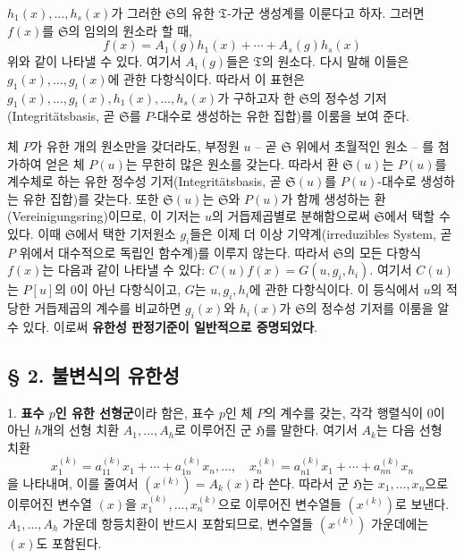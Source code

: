 $h_1(x),\ldots,h_s(x)$가 그러한 $\mathfrak S$의 유한 $\mathfrak T$-가군 생성계를 이룬다고 하자. 그러면 $f(x)$를 $\mathfrak S$의 임의의 원소라 할 때,
\[
 f(x)=A_1(g)h_1(x)+\cdots+A_s(g)h_s(x)
\]
위와 같이 나타낼 수 있다. 여기서 $A_i(g)$들은 $\mathfrak T$의 원소다. 다시 말해 이들은 $g_1(x),\ldots,g_t(x)$에 관한 다항식이다. 따라서 이 표현은 $g_1(x),\ldots,g_t(x),h_1(x),\ldots,h_s(x)$가 구하고자 한 $\mathfrak S$의 정수성 기저(Integrit\"atsbasis, 곧 $\mathfrak S$를 $P$-대수로 생성하는 유한 집합)를 이룸을 보여 준다.

체 $P$가 유한 개의 원소만을 갖더라도, 부정원 $u$ -- 곧 $\mathfrak S$ 위에서 초월적인 원소 -- 를 첨가하여 얻은 체 $P(u)$는 무한히 많은 원소를 갖는다. 따라서 환 $\mathfrak S(u)$는 $P(u)$를 계수체로 하는 유한 정수성 기저(Integritätsbasis, 곧 $\mathfrak S(u)$를 $P(u)$-대수로 생성하는 유한 집합)를 갖는다. 또한 $\mathfrak S(u)$는 $\mathfrak S$와 $P(u)$가 함께 생성하는 환(Vereinigungsring)이므로, 이 기저는 $u$의 거듭제곱별로 분해함으로써 $\mathfrak S$에서 택할 수 있다. 이때 $\mathfrak S$에서 택한 기저원소 $g_i$들은 이제 더 이상 기약계(irreduzibles System, 곧 $P$ 위에서 대수적으로 독립인 함수계)를 이루지 않는다. 따라서 $\mathfrak S$의 모든 다항식 $f(x)$는 다음과 같이 나타낼 수 있다: $C(u)f(x)=G(u,g_i,h_i)$. 여기서 $C(u)$는 $P[u]$의 $0$이 아닌 다항식이고, $G$는 $u,g_i,h_i$에 관한 다항식이다. 이 등식에서 $u$의 적당한 거듭제곱의 계수를 비교하면 $g_i(x)$와 $h_i(x)$가 $\mathfrak S$의 정수성 기저를 이룸을 알 수 있다. 이로써 \textbf{유한성 판정기준이 일반적으로 증명되었다}.

\subsection*{§ 2. 불변식의 유한성}

1. \textbf{표수 $p$인 유한 선형군}이라 함은, 표수 $p$인 체 $P$의 계수를 갖는, 각각 행렬식이 $0$이 아닌 $h$개의 선형 치환 $A_1,\ldots,A_h$로 이루어진 군 $\mathfrak H$를 말한다. 여기서 $A_k$는 다음 선형 치환
\[
 x_1^{(k)}=a_{11}^{(k)}x_1+\cdots+a_{1n}^{(k)}x_n,\ldots,\quad
 x_n^{(k)}=a_{n1}^{(k)}x_1+\cdots+a_{nn}^{(k)}x_n
\]
을 나타내며, 이를 줄여서 $(x^{(k)})=A_k(x)$라 쓴다. 따라서 군 $\mathfrak H$는 $x_1,\ldots,x_n$으로 이루어진 변수열 $(x)$을 $x_1^{(k)},\ldots,x_n^{(k)}$으로 이루어진 변수열들 $(x^{(k)})$로 보낸다. $A_1,\ldots,A_h$ 가운데 항등치환이 반드시 포함되므로, 변수열들 $(x^{(k)})$ 가운데에는 $(x)$도 포함된다.

